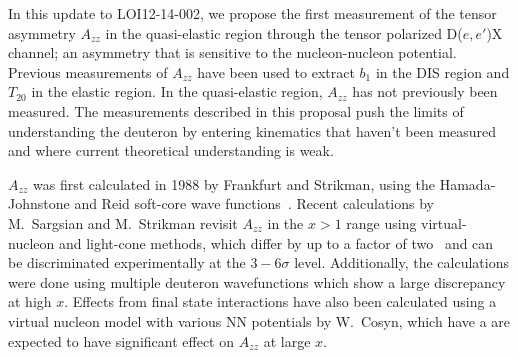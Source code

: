 In this update to LOI12-14-002, we propose the first measurement of the tensor asymmetry $A_{zz}$ in the quasi-elastic region through the tensor polarized D($e,e'$)X channel; an asymmetry that is sensitive to the nucleon-nucleon potential.  Previous measurements of $A_{zz}$ have been used to extract $b_1$ in the DIS region and $T_{20}$ in the elastic region. In the quasi-elastic region, $A_{zz}$ has not previously been measured. The measurements described in this proposal push the limits of understanding the deuteron by entering kinematics that haven't been measured and where current theoretical understanding is weak.


$A_{zz}$ was first calculated in 1988 by Frankfurt and Strikman, using the Hamada-Johnstone and Reid soft-core wave functions~\cite{Frankfurt:1988nt}. Recent calculations by
M.~Sargsian and M.~Strikman revisit $A_{zz}$ in the $x > 1$ range using virtual-nucleon and light-cone methods, which differ by up to a factor of two~\cite{MISAK} and can be discriminated experimentally at the $3-6\sigma$ level. Additionally, the calculations were done using multiple deuteron wavefunctions which show a large discrepancy at high $x$. Effects from final state interactions have also been calculated using a virtual nucleon model with various NN potentials by W.~Cosyn, which have a are expected to have significant effect on $A_{zz}$ at large $x$.



